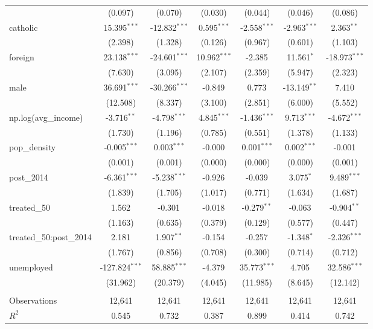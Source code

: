 \begin{table}[!htbp]
\begin{tabular}{@{\extracolsep{5pt}}lcccccc}
  & (0.097) & (0.070) & (0.030) & (0.044) & (0.046) & (0.086) \\
 catholic & 15.395$^{***}$ & -12.832$^{***}$ & 0.595$^{***}$ & -2.558$^{***}$ & -2.963$^{***}$ & 2.363$^{**}$ \\
  & (2.398) & (1.328) & (0.126) & (0.967) & (0.601) & (1.103) \\
 foreign & 23.138$^{***}$ & -24.601$^{***}$ & 10.962$^{***}$ & -2.385$^{}$ & 11.561$^{*}$ & -18.973$^{***}$ \\
  & (7.630) & (3.095) & (2.107) & (2.359) & (5.947) & (2.323) \\
 male & 36.691$^{***}$ & -30.266$^{***}$ & -0.849$^{}$ & 0.773$^{}$ & -13.149$^{**}$ & 7.410$^{}$ \\
  & (12.508) & (8.337) & (3.100) & (2.851) & (6.000) & (5.552) \\
 np.log(avg_income) & -3.716$^{**}$ & -4.798$^{***}$ & 4.845$^{***}$ & -1.436$^{***}$ & 9.713$^{***}$ & -4.672$^{***}$ \\
  & (1.730) & (1.196) & (0.785) & (0.551) & (1.378) & (1.133) \\
 pop_density & -0.005$^{***}$ & 0.003$^{***}$ & -0.000$^{}$ & 0.001$^{***}$ & 0.002$^{***}$ & -0.001$^{}$ \\
  & (0.001) & (0.001) & (0.000) & (0.000) & (0.000) & (0.001) \\
 post_2014 & -6.361$^{***}$ & -5.238$^{***}$ & -0.926$^{}$ & -0.039$^{}$ & 3.075$^{*}$ & 9.489$^{***}$ \\
  & (1.839) & (1.705) & (1.017) & (0.771) & (1.634) & (1.687) \\
 treated_50 & 1.562$^{}$ & -0.301$^{}$ & -0.018$^{}$ & -0.279$^{**}$ & -0.063$^{}$ & -0.904$^{**}$ \\
  & (1.163) & (0.635) & (0.379) & (0.129) & (0.577) & (0.447) \\
 treated_50:post_2014 & 2.181$^{}$ & 1.907$^{**}$ & -0.154$^{}$ & -0.257$^{}$ & -1.348$^{*}$ & -2.326$^{***}$ \\
  & (1.767) & (0.856) & (0.708) & (0.300) & (0.714) & (0.712) \\
 unemployed & -127.824$^{***}$ & 58.885$^{***}$ & -4.379$^{}$ & 35.773$^{***}$ & 4.705$^{}$ & 32.586$^{***}$ \\
  & (31.962) & (20.379) & (4.045) & (11.985) & (8.645) & (12.142) \\
\hline \\[-1.8ex]
 Observations & 12,641 & 12,641 & 12,641 & 12,641 & 12,641 & 12,641 \\
 $R^2$ & 0.545 & 0.732 & 0.387 & 0.899 & 0.414 & 0.742 \\

\end{tabular}
\end{table}
